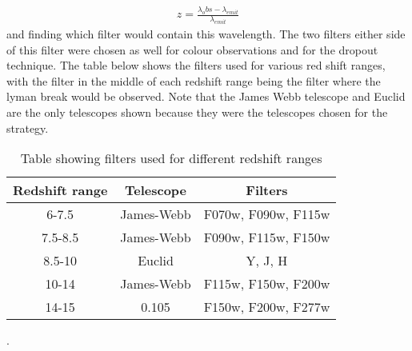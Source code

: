 			\begin{align}
				z=\frac{{{\lambda}_obs}-{{\lambda}_{emit}}}{{{\lambda}_{emit}}}
			\end{align}
and finding which filter would contain this wavelength. The two filters either side of this filter were chosen as well for colour observations and for the dropout technique. The table below shows the filters used for various red shift ranges, with the filter in the middle of each redshift range being the filter where the lyman break would be observed. Note that the James Webb telescope and Euclid are the only telescopes shown because they were the telescopes chosen for the strategy.

\begin{table}[ht]
				\begin{center}
					\begin{tabular}{c|c|c}
						Redshift range &Telescope &Filters   \\
						\hline \hline
						6-7.5	   &James-Webb&  F070w, F090w, F115w \\
						7.5-8.5&James-Webb&  F090w, F115w, F150w \\
						8.5-10 &Euclid&  Y, J, H\\
						10-14  &James-Webb& F115w, F150w, F200w\\
						14-15  &0.105& F150w, F200w, F277w\\
					\end{tabular}
				\end{center}
				\caption{Table showing filters used for different redshift ranges}
				\label{tab:colour_filters}
			\end{table}.




